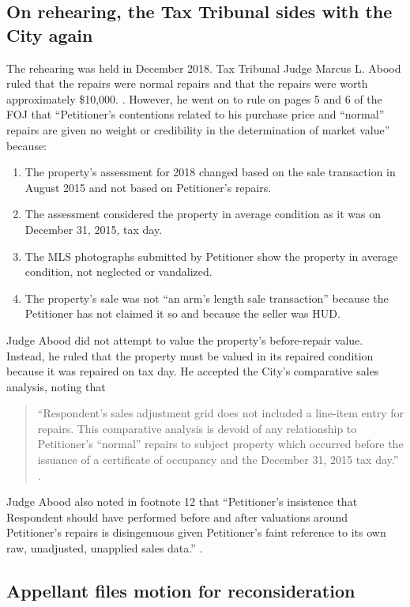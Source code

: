 \documentclass[12pt,\documentclassflag]{michiganCourtOfAppealsBrief}
\begin{document}
\subsection{On rehearing, the Tax Tribunal sides with the City again}

The rehearing was held in December 2018. Tax Tribunal Judge Marcus L. Abood ruled that the repairs were normal repairs and that the repairs were worth approximately \$10,000. \foj[4]. However, he went on to rule on pages 5 and 6 of the FOJ that ``Petitioner's contentions related to his purchase price and ``normal'' repairs are given no weight or credibility in the determination of market value'' because:
\begin{enumerate}
\item The property's assessment for 2018 changed based on the sale transaction in August 2015 and not based on Petitioner's repairs. 
\item The assessment considered the property in average condition as it was on December 31, 2015, tax day.
\item The MLS photographs submitted by Petitioner show the property in average condition, not neglected or vandalized.
\item The property's sale was not ``an arm's length sale transaction'' because the Petitioner has not claimed it so and because the seller was HUD.
\end{enumerate}

Judge Abood did not attempt to value the property's before-repair value. Instead, he ruled that the property must be valued in its repaired condition because it was repaired on tax day. He accepted the City's comparative sales analysis, noting that

\begin{quote}
  ``Respondent's sales adjustment grid does not included a line-item entry for repairs. This comparative analysis is devoid of any relationship to Petitioner's ``normal'' repairs to subject property which occurred before the issuance of a certificate of occupancy and the December 31, 2015 tax day.'' \foj[6].
\end{quote}

Judge Abood also noted in footnote 12 that ``Petitioner's insistence that Respondent should have performed before and after valuations around Petitioner's repairs is disingenuous given Petitioner's faint reference to its own raw, unadjusted, unapplied sales data.'' \foj[5].

\subsection{Appellant files motion for reconsideration}
\end{document}
